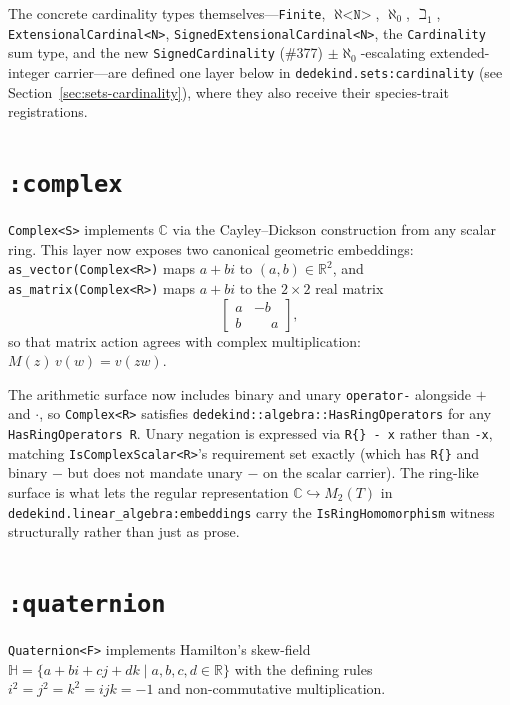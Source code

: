 \documentclass[11pt, a4paper]{report}
\begin{document}
The concrete cardinality types themselves---\texttt{Finite},
$\aleph\texttt{<N>}$, $\aleph_0$, $\beth_1$, \texttt{ExtensionalCardinal<N>},
\texttt{SignedExtensionalCardinal<N>}, the \texttt{Cardinality} sum type, and
the new \texttt{SignedCardinality} (\#377) ${\pm}\aleph_0$-escalating
extended-integer carrier---are defined one layer below in
\texttt{dedekind.sets:cardinality} (see Section~\ref{sec:sets-cardinality}),
where they also receive their species-trait registrations.

\section{\texttt{:complex}}
\label{sec:numbers-complex}

\texttt{Complex<S>} implements $\mathbb{C}$ via the Cayley--Dickson construction from any scalar ring.
This layer now exposes two canonical geometric embeddings:
\texttt{as\_vector(Complex<R>)} maps $a+bi$ to $(a,b) \in \mathbb{R}^2$, and
\texttt{as\_matrix(Complex<R>)} maps $a+bi$ to the $2\times2$ real matrix
\[
\begin{bmatrix}
a & -b \\
b & \phantom{-}a
\end{bmatrix},
\]
so that matrix action agrees with complex multiplication:
$M(z)\,v(w)=v(zw)$.

The arithmetic surface now includes binary and unary \texttt{operator-} alongside $+$ and $\cdot$, so \texttt{Complex<R>} satisfies \texttt{dedekind::algebra::HasRingOperators} for any \texttt{HasRingOperators R}. Unary negation is expressed via \texttt{R\{\} - x} rather than \texttt{-x}, matching \texttt{IsComplexScalar<R>}'s requirement set exactly (which has \texttt{R\{\}} and binary $-$ but does not mandate unary $-$ on the scalar carrier). The ring-like surface is what lets the regular representation $\mathbb{C} \hookrightarrow M_2(T)$ in \texttt{dedekind.linear\_algebra:embeddings} carry the \texttt{IsRingHomomorphism} witness structurally rather than just as prose.

\section{\texttt{:quaternion}}
\label{sec:numbers-quaternion}

\texttt{Quaternion<F>} implements Hamilton's skew-field
$\mathbb{H}=\{a+bi+cj+dk\mid a,b,c,d\in\mathbb{R}\}$ with the defining rules
$i^2=j^2=k^2=ijk=-1$ and non-commutative multiplication.
\end{document}
